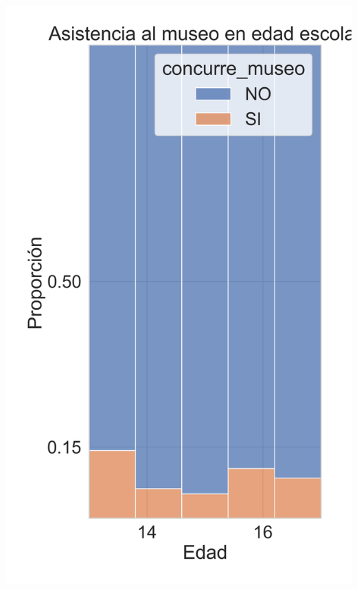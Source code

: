 \documentclass[10pt]{beamer}
\begin{document}
\begin{frame}
\begin{columns}
        \includegraphics[width=\textwidth]{edad_escolar.png}
    \end{columns}

\end{frame}
\end{document}
